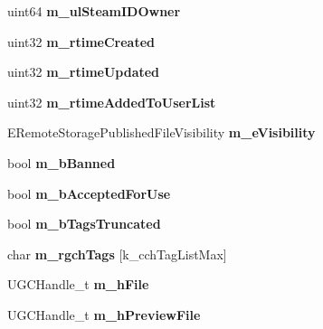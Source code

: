 \begin{DoxyCompactItemize}
uint64 {\bfseries m\+\_\+ul\+Steam\+I\+D\+Owner}
\item 
\mbox{\label{struct_steam_u_g_c_details__t_a84b64074eabe59e3b1792f7d2dba850a}} 
uint32 {\bfseries m\+\_\+rtime\+Created}
\item 
\mbox{\label{struct_steam_u_g_c_details__t_af04acfa8e0d8c9370493cf0835c56028}} 
uint32 {\bfseries m\+\_\+rtime\+Updated}
\item 
\mbox{\label{struct_steam_u_g_c_details__t_a5606b6c8b17e4318d45b9889915e5f77}} 
uint32 {\bfseries m\+\_\+rtime\+Added\+To\+User\+List}
\item 
\mbox{\label{struct_steam_u_g_c_details__t_a7d8dd8905fef43a9f06abf6f8a03b2fd}} 
E\+Remote\+Storage\+Published\+File\+Visibility {\bfseries m\+\_\+e\+Visibility}
\item 
\mbox{\label{struct_steam_u_g_c_details__t_a5756c6178e03159cdf30405d071dca7f}} 
bool {\bfseries m\+\_\+b\+Banned}
\item 
\mbox{\label{struct_steam_u_g_c_details__t_ae2c612ea769f8efb9f4db60b1c542dbb}} 
bool {\bfseries m\+\_\+b\+Accepted\+For\+Use}
\item 
\mbox{\label{struct_steam_u_g_c_details__t_ae02ede384f4b35ee81183537b7524f6e}} 
bool {\bfseries m\+\_\+b\+Tags\+Truncated}
\item 
\mbox{\label{struct_steam_u_g_c_details__t_af9823eb165d633847a8a37be9b1fe729}} 
char {\bfseries m\+\_\+rgch\+Tags} \mbox{[}k\+\_\+cch\+Tag\+List\+Max\mbox{]}
\item 
\mbox{\label{struct_steam_u_g_c_details__t_ab30dffe800a3022524f32e89e44e1c33}} 
U\+G\+C\+Handle\+\_\+t {\bfseries m\+\_\+h\+File}
\item 
\mbox{\label{struct_steam_u_g_c_details__t_a3de5c0f9f6f23c26db773cc3aaf4b84f}} 
U\+G\+C\+Handle\+\_\+t {\bfseries m\+\_\+h\+Preview\+File}

\end{DoxyCompactItemize}
